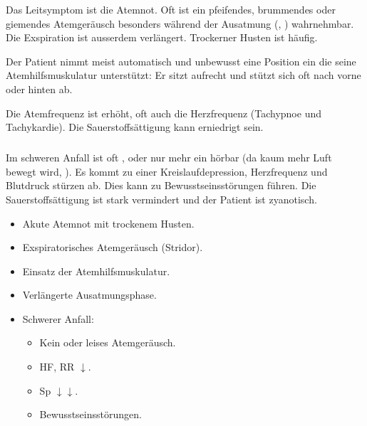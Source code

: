 



\clearpage
{}
{%
Das Leitsymptom ist die Atemnot. Oft ist ein pfeifendes,
brummendes oder giemendes Atemgeräusch besonders während der
Ausatmung (, )
wahrnehmbar. Die Exspiration ist ausserdem verlängert. Trockerner Husten ist häufig.

Der Patient nimmt meist automatisch und unbewusst eine
Position ein die seine Atemhilfsmuskulatur unterstützt: Er
sitzt aufrecht und stützt sich oft nach vorne oder hinten
ab. 

Die Atemfrequenz ist erhöht, oft auch die Herzfrequenz
(Tachypnoe und Tachykardie). Die Sauerstoffsättigung kann
erniedrigt sein. 

\subparagraph{}

Im schweren Anfall ist oft , oder nur mehr ein
 hörbar (da kaum mehr
Luft bewegt wird, ). Es kommt zu einer
Kreislaufdepression, Herzfrequenz und Blutdruck stürzen ab.
Dies kann zu Bewusstseinsstörungen führen. Die
Sauerstoffsättigung ist stark vermindert und der Patient ist zyanotisch.


}{
\begin{itemize}
  \item Akute Atemnot mit trockenem Husten.
  \item Exspiratorisches Atemgeräusch (Stridor).
  \item Einsatz der Atemhilfsmuskulatur.
  \item Verlängerte Ausatmungsphase.
  \item Schwerer Anfall:
  \begin{itemize}
    \item Kein oder leises Atemgeräusch.
    \item HF, RR $\downarrow$.
    \item Sp $\downarrow\downarrow$.
    \item Bewusstseinsstörungen.
  \end{itemize}
\end{itemize}
}
{}
{}
{}

